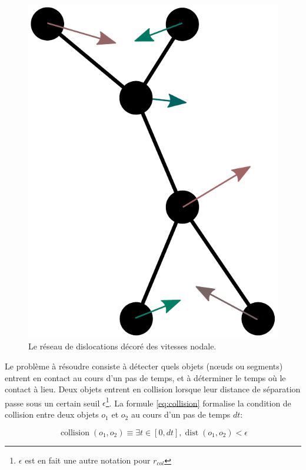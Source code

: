 \documentclass[11pt,class=article,float=false,crop=false]{standalone}
\begin{document}
\begin{figure}[H]
	\centering
	\includegraphics[height=0.2\textheight]{img/collision-detection-probleme}
	\caption{Le réseau de dislocations décoré des vitesses nodale.}
	\label{fig:collision-detection-probleme}
\end{figure}

Le problème à résoudre consiste à détecter quels objets (nœuds ou segments) entrent en contact au cours d'un pas de temps, et à déterminer le temps où le contact à lieu. Deux objets entrent en collision lorsque leur distance de séparation passe sous un certain seuil $\epsilon$\footnote{$\epsilon$ est en fait une autre notation pour $r_{col}$}. La formule \ref{eq:collision} formalise la condition de collision entre deux objets $o_1$ et $o_2$ au cours d'un pas de temps $dt$:

\begin{equation}
\operatorname{collision}(o_1,o_2) \equiv \exists t \in [0,dt] ,  \operatorname{dist}(o_1,o_2) < \epsilon	
\label{eq:collision}
\end{equation}
\end{document}
